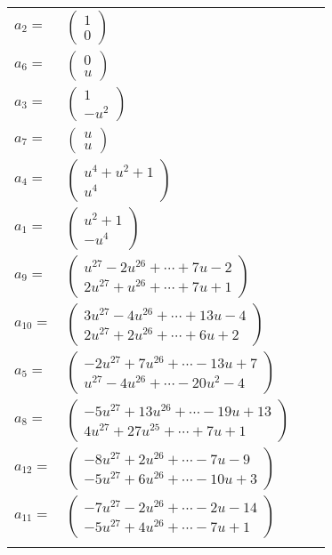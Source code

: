 \documentclass[1p]{elsarticle_modified}
\theoremstyle{definition}
\begin{document}
\begin{tabular}{m{7pt} m{180pt} m{7pt} m{180pt} }
\flushright $a_{2}=$&$\begin{pmatrix}1\\0\end{pmatrix}$ \\
\flushright $a_{6}=$&$\begin{pmatrix}0\\u\end{pmatrix}$ \\
\flushright $a_{3}=$&$\begin{pmatrix}1\\- u^2\end{pmatrix}$ \\
\flushright $a_{7}=$&$\begin{pmatrix}u\\u\end{pmatrix}$ \\
\flushright $a_{4}=$&$\begin{pmatrix}u^4+u^2+1\\u^4\end{pmatrix}$ \\
\flushright $a_{1}=$&$\begin{pmatrix}u^2+1\\- u^4\end{pmatrix}$ \\
\flushright $a_{9}=$&$\begin{pmatrix}u^{27}-2 u^{26}+\cdots+7 u-2\\2 u^{27}+u^{26}+\cdots+7 u+1\end{pmatrix}$ \\
\flushright $a_{10}=$&$\begin{pmatrix}3 u^{27}-4 u^{26}+\cdots+13 u-4\\2 u^{27}+2 u^{26}+\cdots+6 u+2\end{pmatrix}$ \\
\flushright $a_{5}=$&$\begin{pmatrix}-2 u^{27}+7 u^{26}+\cdots-13 u+7\\u^{27}-4 u^{26}+\cdots-20 u^2-4\end{pmatrix}$ \\
\flushright $a_{8}=$&$\begin{pmatrix}-5 u^{27}+13 u^{26}+\cdots-19 u+13\\4 u^{27}+27 u^{25}+\cdots+7 u+1\end{pmatrix}$ \\
\flushright $a_{12}=$&$\begin{pmatrix}-8 u^{27}+2 u^{26}+\cdots-7 u-9\\-5 u^{27}+6 u^{26}+\cdots-10 u+3\end{pmatrix}$ \\
\flushright $a_{11}=$&$\begin{pmatrix}-7 u^{27}-2 u^{26}+\cdots-2 u-14\\-5 u^{27}+4 u^{26}+\cdots-7 u+1\end{pmatrix}$\\&\end{tabular}
\end{document}
